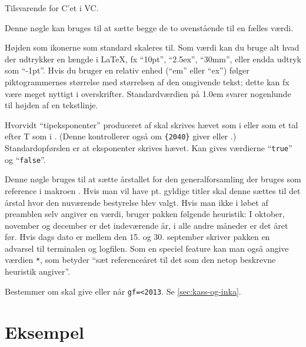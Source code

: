 \documentclass[a4paper,article,oneside,danish]{memoir}
\newcommand*{\descopt}[1]{%
  \medskip\noindent\llap{\color{option}#1\hspace*{8pt}}\ignorespaces}
\begin{document}
\descopt{vcC} Tilsvarende for C'et i VC.

\descopt{C} Denne nøgle kan bruges til at sætte begge de to
ovenstående til en fælles værdi.

\descopt{ikonh} Højden som ikonerne som standard skaleres
til. Som værdi kan du bruge alt hvad der udtrykker en længde i \LaTeX,
fx \enquote{10pt}, \enquote{2.5ex}, \enquote{30mm}, eller endda udtryk som
\enquote{-1pt}. Hvis du bruger en relativ enhed (\enquote{em} eller
\enquote{ex}) følger piktogrammernes størrelse med størrelsen af den omgivende
tekst; dette kan fx være meget nyttigt i overskrifter. Standardværdien
på 1.0em svarer nogenlunde til højden af en tekstlinje.

\descopt{eksponent} Hvorvidt \enquote{tipeksponenter} produceret af
 skal skrives hævet som i {\KASS} eller
som et tal efter T som i
{}. (Denne kontrollerer
også om \texttt{\{2040\}} giver  eller
{}.) Standardopførslen er at
eksponenter skrives hævet. Kan gives værdierne \enquote{\texttt{true}} og
\enquote{\texttt{false}}.

\descopt{gf} Denne nøgle bruges til at sætte årstallet for den
generalforsamling der bruges som reference i makroen
. Hvis man vil have pt. gyldige titler skal denne sættes
til det årstal hvor den nuværende bestyrelse blev valgt. Hvis man ikke
i løbet af preamblen selv angiver en værdi, bruger pakken følgende
heuristik: I oktober, november og december er det indeværende år, i
alle andre måneder er det året før. Hvis dags dato er mellem den
15. og 30. september skriver pakken en advarsel til terminalen og
logfilen. Som en speciel feature kan man også angive værdien
\texttt{*}, som betyder \enquote{sæt referenceåret til det som den netop
beskrevne heuristik angiver}.

\descopt{koelleKASS} Bestemmer om  skal give \ikonKASSkoeller eller
\ikonKASSkugler når \texttt{gf=<2013}. Se \vref{sec:kass-og-inka}.

\section{Eksempel}
\label{sec:eksempel}
\end{document}
